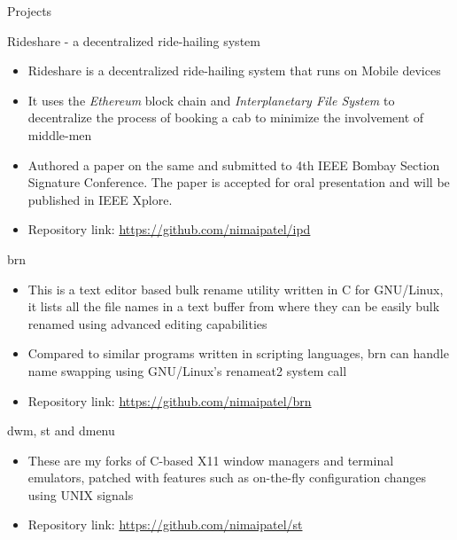 \documentclass{article}
\newlength{\tabin}
\newlength{\secsep}
\newcommand{\lineunder}{\vspace*{-8pt} \\ \hspace*{-6pt} \hrulefill \\ \vspace*{-15pt}}
\newenvironment{tabbedsection}[1]{
	\begin{list}{}{
		\setlength{\itemsep}{0pt}
		\setlength{\labelsep}{0pt}
		\setlength{\labelwidth}{0pt}
		\setlength{\leftmargin}{\tabin}
		\setlength{\rightmargin}{\tabin}
		\setlength{\listparindent}{0pt}
		\setlength{\parsep}{0pt}
		\setlength{\parskip}{0pt}
		\setlength{\partopsep}{0pt}
		\setlength{\topsep}{#1}
	}
	\item[]
}{\end{list}}
\newenvironment{resume_section}[1]{
	\filbreak
	\vspace{2\secsep}
	\textsc{\large#1}
	\lineunder
	\begin{tabbedsection}{\secsep}
}{\end{tabbedsection}}
\newenvironment{resume_subsection}[2][]{
	\textbf{#2} \hfill {\footnotesize #1} \hspace{2em}
	\begin{tabbedsection}{0.5\secsep}
}{\end{tabbedsection}}
\newenvironment{subitems}{
	\renewcommand{\labelitemi}{-}
	\begin{itemize}
		\setlength{\labelsep}{1em}
}{\end{itemize}}
\begin{document}
\begin{resume_section}{Projects}

	\begin{resume_subsection}{Rideshare - a decentralized ride-hailing system}
		\begin{subitems}
			\item Rideshare is a decentralized ride-hailing system
				that runs on Mobile devices
			\item It uses the \textit{Ethereum} block chain and
				\textit{Interplanetary File System} to decentralize the
				process of booking a cab to minimize the
				involvement of middle-men
			\item Authored a paper on the same and submitted to 4th IEEE Bombay Section Signature Conference. 
				The paper is accepted for oral presentation and will be published in IEEE Xplore.
			\item Repository link:
				\href{https://github.com/nimaipatel/ipd}{https://github.com/nimaipatel/ipd}
		\end{subitems}
	\end{resume_subsection}

	\begin{resume_subsection}{brn}
		\begin{subitems}
			\item This is a text editor based bulk rename utility
				written in C for GNU/Linux, it lists all the
				file names in a text buffer from where they can
				be easily bulk renamed using advanced editing
				capabilities
			\item Compared to similar programs written in scripting
				languages, brn can handle name swapping using
				GNU/Linux's renameat2 system call
			\item Repository link: \href{https://github.com/nimaipatel/brn}{https://github.com/nimaipatel/brn}
		\end{subitems}
	\end{resume_subsection}

	\begin{resume_subsection}{dwm, st and dmenu}
		\begin{subitems}
			\item These are my forks of C-based X11 window managers and terminal emulators, patched with features such as on-the-fly configuration changes using UNIX signals
			\item Repository link: \href{https://github.com/nimaipatel/st}{https://github.com/nimaipatel/st}
		\end{subitems}
	\end{resume_subsection}


\end{resume_section}
\end{document}
